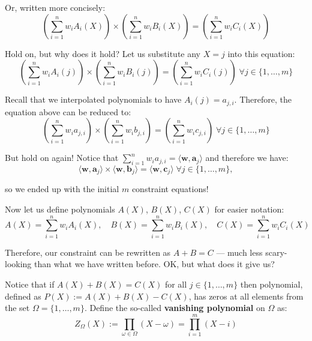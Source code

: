 \documentclass[../lecture-notes.tex]{subfiles}
\begin{document}
Or, written more concisely:
\begin{equation*}
    \left( \sum_{i = 1}^{n} w_iA_i(X) \right) \times \left( \sum_{i = 1}^{n} w_iB_i(X) \right) = \left( \sum_{i = 1}^{n} w_iC_i(X) \right)
\end{equation*}

\begin{remark}
    Hold on, but why does it hold? Let us substitute any $X=j$ into this equation:
    \begin{equation*}
        \left( \sum_{i = 1}^{n} w_iA_i(j) \right) \times \left( \sum_{i = 1}^{n} w_iB_i(j) \right) = \left( \sum_{i = 1}^{n} w_iC_i(j) \right) \; \forall j \in \{1,\dots,m\}
    \end{equation*}

    Recall that we interpolated polynomials to have $A_i(j) = a_{j,i}$. Therefore, the equation above can be reduced to:
    \begin{equation*}
        \left( \sum_{i = 1}^{n} w_ia_{j,i} \right) \times \left( \sum_{i = 1}^{n} w_ib_{j,i} \right) = \left( \sum_{i = 1}^{n} w_ic_{j,i} \right) \; \forall j \in \{1,\dots,m\}
    \end{equation*}

    But hold on again! Notice that $\sum_{i = 1}^{n} w_ia_{j,i} = \langle \mathbf{w}, \mathbf{a}_j \rangle$ and therefore we have:
    \begin{equation*}
        \langle \mathbf{w}, \mathbf{a}_j \rangle \times \langle \mathbf{w}, \mathbf{b}_j \rangle = \langle \mathbf{w}, \mathbf{c}_j \rangle \; \forall j \in \{1,\dots,m\},
    \end{equation*}
    
    so we ended up with the initial $m$ constraint equations!
\end{remark}

Now let us define polynomials $A(X)$, $B(X)$, $C(X)$ for easier notation: 
\begin{equation*}
    A(X) = \sum_{i = 1}^{n} w_iA_i(X), \quad B(X) = \sum_{i = 1}^{n} w_iB_i(X), \quad C(X) = \sum_{i = 1}^{n} w_iC_i(X)
\end{equation*}

Therefore, our constraint can be rewritten as $A + B = C$ --- much less scary-looking than what we have written before. OK, but what does it give us? 

Notice that if $A(X)+B(X)=C(X)$ for all $j \in \{1,\dots,m\}$ then polynomial, defined as $P(X) := A(X)+B(X)-C(X)$, has zeros at all elements from the set $\Omega = \{1,\dots,m\}$. Define the so-called \textbf{vanishing polynomial} on $\Omega$ as:
\begin{equation*}
    Z_{\Omega}(X) := \prod_{\omega \in \Omega} (X - \omega) = \prod_{i=1}^m (X - i)
\end{equation*} 
\end{document}

